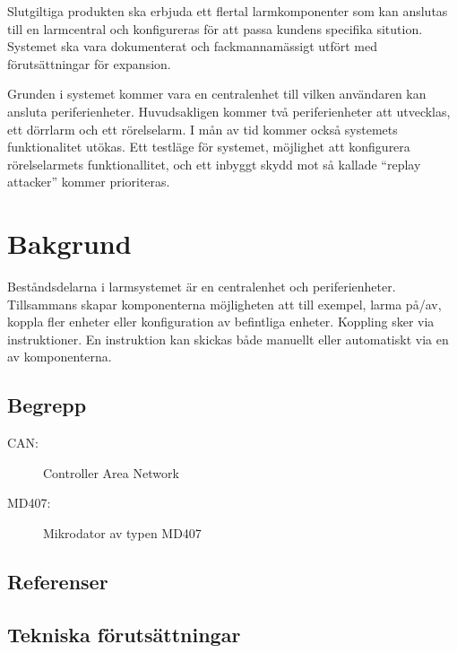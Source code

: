 \documentclass[a4paper]{article}
\begin{document}

Slutgiltiga produkten ska erbjuda ett flertal larmkomponenter som kan anslutas till en larmcentral och konfigureras för att passa kundens specifika sitution. Systemet ska vara dokumenterat och fackmannamässigt utfört med förutsättningar för expansion.

Grunden i systemet kommer vara en centralenhet till vilken användaren kan ansluta periferienheter. Huvudsakligen kommer två periferienheter att utvecklas, ett dörrlarm och ett rörelselarm. I mån av tid kommer också systemets funktionalitet utökas. Ett testläge för systemet, möjlighet att konfigurera rörelselarmets funktionallitet, och ett inbyggt skydd mot så kallade ``replay attacker'' kommer prioriteras.


\section{Bakgrund}

Beståndsdelarna i larmsystemet är en centralenhet och periferienheter. Tillsammans skapar komponenterna möjligheten att till exempel, larma på/av, koppla fler enheter eller konfiguration av befintliga enheter. Koppling sker via instruktioner. En instruktion kan skickas både manuellt eller automatiskt via en av komponenterna.

\subsection{Begrepp}

\begin{description}
    \item[CAN:] Controller Area Network
    \item[MD407:] Mikrodator av typen MD407
\end{description}

\subsection{Referenser}

\subsection{Tekniska förutsättningar}
\end{document}
